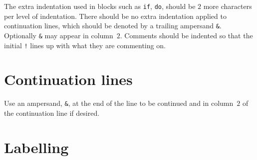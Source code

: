 \documentclass[11pt,twoside,a4paper]{report}
\newcommand{\T}[1]{{\tt #1}}
\begin{document}
The extra indentation used in blocks such as \T{if}, \T{do}, should be
$2$ more characters per level of indentation.
There should be no extra indentation applied to continuation lines, which
should be denoted by a trailing ampersand \verb|&|. Optionally \verb|&|
may appear in column~$2$.
Comments should be indented so that the initial \verb|!| lines up with
what they are commenting on.
%


\section{Continuation lines}

Use an ampersand, \verb|&|, at the end of the line to be continued
and in column~$2$ of the continuation line if desired.

\section{Labelling}
\end{document}
